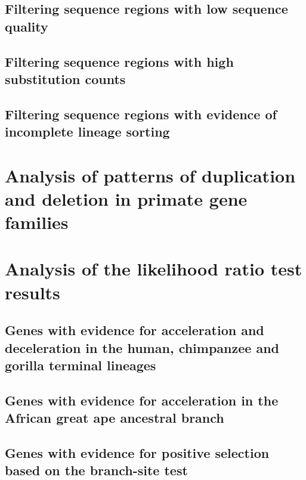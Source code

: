 \subsection{Filtering sequence regions with low sequence quality}

\subsection{Filtering sequence regions with high substitution counts}

\subsection{Filtering sequence regions with evidence of incomplete lineage sorting}

\section{Analysis of patterns of duplication and deletion in primate gene families}

\section{Analysis of the likelihood ratio test results}

\subsection{Genes with evidence for acceleration and deceleration in the human, chimpanzee and gorilla terminal lineages}

\subsection{Genes with evidence for acceleration in the African great ape ancestral branch}

\subsection{Genes with evidence for positive selection based on the branch-site test}

